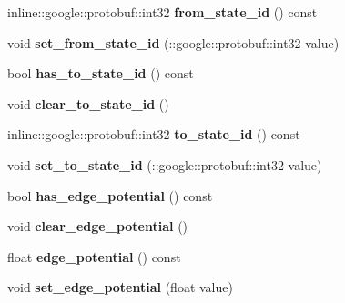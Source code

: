 \begin{DoxyCompactItemize}
\item 
\hypertarget{classgraph_1_1EdgeStatePotential_ad678b0868680612ca50ef3bedf14b462}{
inline::google::protobuf::int32 {\bfseries from\_\-state\_\-id} () const }
\label{classgraph_1_1EdgeStatePotential_ad678b0868680612ca50ef3bedf14b462}

\item 
\hypertarget{classgraph_1_1EdgeStatePotential_ab23b81819bc6d9dd71d319c49412c8d8}{
void {\bfseries set\_\-from\_\-state\_\-id} (::google::protobuf::int32 value)}
\label{classgraph_1_1EdgeStatePotential_ab23b81819bc6d9dd71d319c49412c8d8}

\item 
\hypertarget{classgraph_1_1EdgeStatePotential_a1c2e8dc8b84f5aacf08e5c46866f04c6}{
bool {\bfseries has\_\-to\_\-state\_\-id} () const }
\label{classgraph_1_1EdgeStatePotential_a1c2e8dc8b84f5aacf08e5c46866f04c6}

\item 
\hypertarget{classgraph_1_1EdgeStatePotential_a7f30d4b4ff6eb1c6695799be4eeefea5}{
void {\bfseries clear\_\-to\_\-state\_\-id} ()}
\label{classgraph_1_1EdgeStatePotential_a7f30d4b4ff6eb1c6695799be4eeefea5}

\item 
\hypertarget{classgraph_1_1EdgeStatePotential_a5f8bb1f4044636b27eba6e50e294bcc8}{
inline::google::protobuf::int32 {\bfseries to\_\-state\_\-id} () const }
\label{classgraph_1_1EdgeStatePotential_a5f8bb1f4044636b27eba6e50e294bcc8}

\item 
\hypertarget{classgraph_1_1EdgeStatePotential_ad498cc27a96c02d74bc44718f289771c}{
void {\bfseries set\_\-to\_\-state\_\-id} (::google::protobuf::int32 value)}
\label{classgraph_1_1EdgeStatePotential_ad498cc27a96c02d74bc44718f289771c}

\item 
\hypertarget{classgraph_1_1EdgeStatePotential_a74db33f4d6408cb2f00a4c02d5b8d492}{
bool {\bfseries has\_\-edge\_\-potential} () const }
\label{classgraph_1_1EdgeStatePotential_a74db33f4d6408cb2f00a4c02d5b8d492}

\item 
\hypertarget{classgraph_1_1EdgeStatePotential_a8962a3e1a075a505dc2b212dd0308791}{
void {\bfseries clear\_\-edge\_\-potential} ()}
\label{classgraph_1_1EdgeStatePotential_a8962a3e1a075a505dc2b212dd0308791}

\item 
\hypertarget{classgraph_1_1EdgeStatePotential_a841fbeee1c881516d881fb0351f59662}{
float {\bfseries edge\_\-potential} () const }
\label{classgraph_1_1EdgeStatePotential_a841fbeee1c881516d881fb0351f59662}

\item 
\hypertarget{classgraph_1_1EdgeStatePotential_aafc6b6bf33dead5ba6f14120af0c3a1f}{
void {\bfseries set\_\-edge\_\-potential} (float value)}
\label{classgraph_1_1EdgeStatePotential_aafc6b6bf33dead5ba6f14120af0c3a1f}

\end{DoxyCompactItemize}
